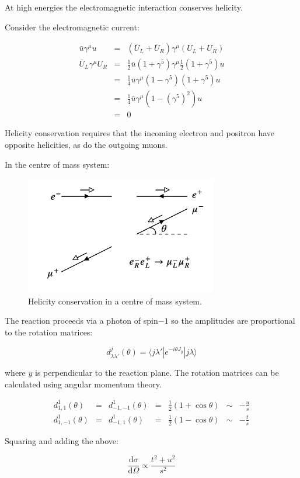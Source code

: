 At high energies the electromagnetic interaction conserves helicity.

Consider the electromagnetic current:

\begin{eqnarray*}
  \bar{u}\gamma^{\mu}u & = & \left(\bar{U}_L + \bar{U}_R\right)\gamma^{\mu}\left(U_L + U_R\right) \\
  \bar{U}_L\gamma^{\mu}U_R & = & \frac{1}{2}\bar{u}\left(1 + \gamma^5\right)\gamma^{\mu}\frac{1}{2}\left(1 + \gamma^5\right)u \\
  & = & \frac{1}{4}\bar{u}\gamma^{\mu}\left(1 - \gamma^5\right)\left(1 + \gamma^5\right)u \\
  & = & \frac{1}{4}\bar{u}\gamma^{\mu}\left(1 - \left(\gamma^5\right)^2\right)u \\
  & = & 0
\end{eqnarray*}

Helicity conservation requires that the incoming electron and positron have opposite helicities, as do the outgoing muons.

In the centre of mass system:

\begin{figure}[!htb]
  \begin{center}
    \includegraphics[width=0.75\textwidth]{images/web_feynman/image_33.png}
    \caption[Helicity conservation in a centre of mass system]{Helicity conservation in a centre of mass system.}
    \label{fig:ch8_helicityConservation}
  \end{center}
\end{figure}

The reaction proceeds via a photon of spin$-1$ so the amplitudes are proportional to the rotation matrices:

\[
  d^j_{\lambda\lambda'}(\theta) = \langle j\lambda'|e^{-i\theta J_y}|j \lambda\rangle
\]

where $y$ is perpendicular to the reaction plane.  The rotation matrices can be calculated using angular momentum theory.

\[
  \begin{array}{ccccccc}
  d^1_{1,1}  (\theta) & = & d^1_{-1,-1}(\theta) & = & \frac{1}{2}\left(1 + \cos\theta\right) & \sim & -\frac{u}{s} \\
  d^1_{1,-1} (\theta) & = & d^1_{-1,1} (\theta) & = & \frac{1}{2}\left(1 - \cos\theta\right) & \sim & -\frac{t}{s}
  \end{array}
\]

Squaring and adding the above:

\[
  \frac{\mathrm{d}\sigma}{\mathrm{d}\Omega} \propto \frac{t^2 + u^2}{s^2}
\]
